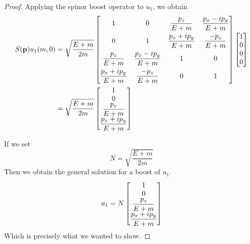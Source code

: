 \documentclass[12pt,a4paper]{article}
\begin{document}
\begin{solution_pset}
\begin{proof}
			Applying the spinor boost operator to $u_1$, we obtain
			\begin{align*}
				S(\vb{p}) u_1(m,0)
				&=
				\sqrt{\frac{E+m}{2m}}
				\begin{bmatrix}
					1 & 0 & \dfrac{p_z}{E+m} & \dfrac{p_x - ip_y}{E+m} \\[8pt]
					0 & 1 & \dfrac{p_x + ip_y}{E+m} & \dfrac{-p_z}{E+m} \\[8pt]
					\dfrac{p_z}{E+m} & \dfrac{p_x - ip_y}{E+m} & 1 & 0 \\[8pt]
					\dfrac{p_x + ip_y}{E+m} & \dfrac{-p_z}{E+m} & 0 & 1
				\end{bmatrix}
				\bmqty{
					1\\0\\0\\0
				}\\
				&=
				\sqrt{\frac{E+m}{2m}}
				\bmqty{
					1\\0\\
					\dfrac{p_z}{E+m} 
					\\
					\dfrac{p_x + ip_y}{E+m} 
				}
			\end{align*}

			If we set 
			\[
				N = 
				\sqrt{\frac{E+m}{2m}}
			\]
			Then we obtain the general solution for a boost of $u_1$.
			\begin{equation}
				u_1 = 
				\label{eq:boost-u1}
				N
				\bmqty{
					1\\0\\
					\dfrac{p_z}{E+m} 
					\\
					\dfrac{p_x + ip_y}{E+m} 
				}
			\end{equation}
			Which is precisely what we wanted to show.


\end{proof}
\end{solution_pset}
\end{document}
